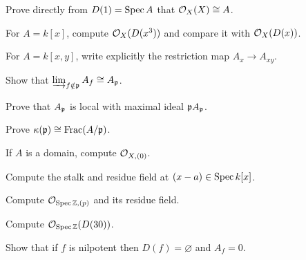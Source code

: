 \begin{exercise}\label{ex:vi17-01}
Prove directly from $D(1)=\operatorname{Spec} A$ that $\mathcal O_X(X)\cong A$.
\end{exercise}

\begin{exercise}\label{ex:vi17-02}
For $A=k[x]$, compute $\mathcal O_X(D(x^3))$ and compare it with $\mathcal O_X(D(x))$.
\end{exercise}

\begin{exercise}[Restriction]\label{ex:vi17-03}
For $A=k[x,y]$, write explicitly the restriction map $A_x\to A_{xy}$.
\end{exercise}

\begin{exercise}\label{ex:vi17-04}
Show that $\varinjlim_{f\notin\mathfrak p}A_f\cong A_{\mathfrak p}$.
\end{exercise}

\begin{exercise}\label{ex:vi17-05}
Prove that $A_{\mathfrak p}$ is local with maximal ideal $\mathfrak p A_{\mathfrak p}$.
\end{exercise}

\begin{exercise}\label{ex:vi17-06}
Prove $\kappa(\mathfrak p)\cong\operatorname{Frac}(A/\mathfrak p)$.
\end{exercise}

\begin{exercise}\label{ex:vi17-07}
If $A$ is a domain, compute $\mathcal O_{X,(0)}$.
\end{exercise}

\begin{exercise}\label{ex:vi17-08}
Compute the stalk and residue field at $(x-a)\in\operatorname{Spec} k[x]$.
\end{exercise}

\begin{exercise}\label{ex:vi17-09}
Compute $\mathcal O_{\operatorname{Spec}\mathbb Z,(p)}$ and its residue field.
\end{exercise}

\begin{exercise}\label{ex:vi17-10}
Compute $\mathcal O_{\operatorname{Spec}\mathbb Z}(D(30))$.
\end{exercise}

\begin{exercise}\label{ex:vi17-11}
Show that if $f$ is nilpotent then $D(f)=\varnothing$ and $A_f=0$.
\end{exercise}

